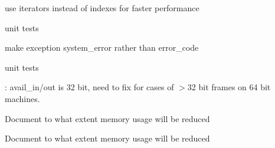
\begin{DoxyRefList}
\item[\label{todo__todo000001}%
\Hypertarget{todo__todo000001}%
Member \mbox{\hyperlink{classfc_1_1path_a12a75eca015d0c9880e2c062e371d08d}{fc\+:\+:path\+:\+:windows\+\_\+string}} () const]use iterators instead of indexes for faster performance  
\item[\label{todo__todo000007}%
\Hypertarget{todo__todo000007}%
Member \mbox{\hyperlink{classwebsocketpp_1_1connection_a867f94b82788e978ea116d50cf83d72e}{websocketpp\+:\+:connection$<$ config $>$\+:\+:handle\+\_\+write\+\_\+frame}} (lib\+::error\+\_\+code const \&ec)]unit tests 
\item[\label{todo__todo000005}%
\Hypertarget{todo__todo000005}%
Member \mbox{\hyperlink{classwebsocketpp_1_1connection_a29900da403dbafab8095c0989104be90}{websocketpp\+:\+:connection$<$ config $>$\+:\+:send}} (message\+\_\+ptr msg)]make exception system\+\_\+error rather than error\+\_\+code 
\item[\label{todo__todo000006}%
\Hypertarget{todo__todo000006}%
Member \mbox{\hyperlink{classwebsocketpp_1_1connection_a8d26a29e90d4847f3882c280112c6b60}{websocketpp\+:\+:connection$<$ config $>$\+:\+:write\+\_\+frame}} ()]unit tests 
\item[\label{todo__todo000014}%
\Hypertarget{todo__todo000014}%
Member \mbox{\hyperlink{classwebsocketpp_1_1extensions_1_1permessage__deflate_1_1enabled_a3002ea83fbc0066f9ecf23b4be082365}{websocketpp\+:\+:extensions\+:\+:permessage\+\_\+deflate\+:\+:enabled$<$ config $>$\+:\+:compress}} (std\+::string const \&in, std\+::string \&out)]\+: avail\+\_\+in/out is 32 bit, need to fix for cases of $>$32 bit frames on 64 bit machines. 
\item[\label{todo__todo000013}%
\Hypertarget{todo__todo000013}%
Member \mbox{\hyperlink{classwebsocketpp_1_1extensions_1_1permessage__deflate_1_1enabled_a21e8e0200cab9dd276842ce9ecbd6639}{websocketpp\+:\+:extensions\+:\+:permessage\+\_\+deflate\+:\+:enabled$<$ config $>$\+:\+:enable\+\_\+client\+\_\+no\+\_\+context\+\_\+takeover}} ()]Document to what extent memory usage will be reduced 
\item[\label{todo__todo000012}%
\Hypertarget{todo__todo000012}%
Member \mbox{\hyperlink{classwebsocketpp_1_1extensions_1_1permessage__deflate_1_1enabled_a9275c22cfd6782ef72a722168d663d8b}{websocketpp\+:\+:extensions\+:\+:permessage\+\_\+deflate\+:\+:enabled$<$ config $>$\+:\+:enable\+\_\+server\+\_\+no\+\_\+context\+\_\+takeover}} ()]Document to what extent memory usage will be reduced 

\end{DoxyRefList}
